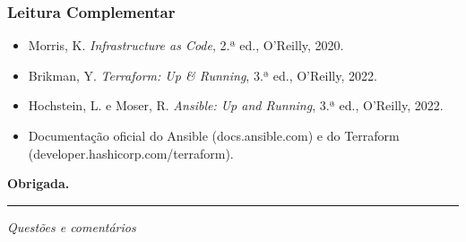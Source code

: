 \documentclass[aspectratio=169]{beamer}
\begin{document}
\begin{frame}
\frametitle{Leitura Complementar}
\begin{itemize}
    \setlength\itemsep{0.4cm}
    \item Morris, K. \emph{Infrastructure as Code}, 2.ª ed., O'Reilly, 2020.
    \item Brikman, Y. \emph{Terraform: Up \& Running}, 3.ª ed., O'Reilly, 2022.
    \item Hochstein, L. e Moser, R. \emph{Ansible: Up and Running}, 3.ª ed., O'Reilly, 2022.
    \item Documentação oficial do Ansible (docs.ansible.com) e do Terraform (developer.hashicorp.com/terraform).
\end{itemize}
\end{frame}

\begin{frame}[plain]
  \vspace*{3cm}
  \begin{center}
    \Huge\bfseries\textcolor{TextEspresso}{Obrigada.}\par
    \vspace{0.5cm}
    {\color{NudeTaupe}\rule{2cm}{0.5pt}}\par
    \vspace{0.5cm}
    \Large\textcolor{TextEspresso}{\itshape Questões e comentários}
  \end{center}
\end{frame}
\end{document}
